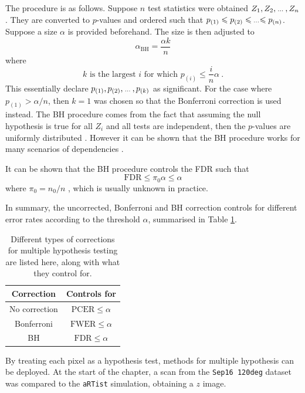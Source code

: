The procedure is as follows. Suppose $n$ test statistics were obtained $Z_1,Z_2,\dotdotdot,Z_n$. They are converted to $p$-values and ordered such that $p_{(1)}\leqslant p_{(2)}\leqslant \dotdotdot \leqslant p_{(n)}$. Suppose a size $\alpha$ is provided beforehand. The size is then adjusted to
\begin{equation}
    \alpha_{\text{BH}} = \frac{\alpha k}{n}
\end{equation}
where
\begin{equation}
    k\text{ is the largest }i\text{ for which }p_{(i)}\leqslant\frac{i}{n}\alpha
    \ .
\end{equation}
This essentially declare $p_{(1)},p_{(2)},\dotdotdot,p_{(k)}$ as significant. For the case where $p_{(1)}>\alpha/n$, then $k=1$ was chosen so that the Bonferroni correction is used instead. The BH procedure comes from the fact that assuming the null hypothesis is true for all $Z_i$ and all tests are independent, then the $p$-values are uniformly distributed \citep{simes1986improved}. However it can be shown that the BH procedure works for many scenarios of dependencies \citep{benjamini2001control}. 

It can be shown that the BH procedure controls the FDR such that
\begin{equation}
    \text{FDR}\leqslant\pi_0\alpha\leqslant\alpha
\end{equation}
where $\pi_0=n_0/n$ \citep{benjamini1995controlling}, which is usually unknown in practice.

In summary, the uncorrected, Bonferroni and BH correction controls for different error rates according to the threshold $\alpha$, summarised in Table \ref{table:inference_corrections}.

\begin{table}
    \centering
    \begin{tabular}{c|c}
        Correction&Controls for\\\hline
        No correction&$\text{PCER}\leqslant\alpha$\\
        Bonferroni&$\text{FWER}\leqslant\alpha$\\
        BH&$\text{FDR}\leqslant\alpha$
    \end{tabular}
    \caption{Different types of corrections for multiple hypothesis testing are listed here, along with what they control for.}
    \label{table:inference_corrections}
\end{table}

By treating each pixel as a hypothesis test, methods for multiple hypothesis can be deployed. At the start of the chapter, a scan from the \texttt{Sep16 120deg} dataset was compared to the \texttt{aRTist} simulation, obtaining a $z$ image.

